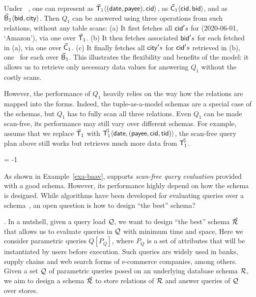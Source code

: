 \begin{example}\label{exa-baav}
Under \baav~\cite{VLDB19}, one can represent  as
$\vec{\protect\mathsf{T}}_{1}\langle (\protect\mathsf{date},\allowbreak \protect\mathsf{payee}),\allowbreak \protect\mathsf{cid}\rangle$,
 as $\vec{\protect\mathsf{C}}_{1}\langle \protect\mathsf{cid},\allowbreak \protect\mathsf{bid}\rangle$,
and  as $\vec{\protect\mathsf{B}}_{1}\langle \protect\mathsf{bid},\allowbreak \protect\mathsf{city}\rangle$.
Then $Q_{1}$ can be answered using three \get operations
from such relations, without any table scans:
(a) It first fetches all $\protect\mathsf{cid}'s$ for ({\normalsize 2020-06-01},
{\normalsize `Amazon'}), via one \get over $\vec{\protect\mathsf{T}}_{1}$.
(b) It then fetches associated $\protect\mathsf{bid}'s$ for each
 fetched in (a), via one \get over $\vec{\protect\mathsf{C}}_{1}$.
(c) It finally fetches all $\protect\mathsf{city}'s$ for $\protect\mathsf{cid}'s$
retrieved in (b), one \get~for %
each  over $\vec{\protect\mathsf{B}}_{1}$.
This illustrates the flexibility and benefits of the \baav
model: it allows us to retrieve only necessary data values for
answering $Q_{1}$ without the costly scans. %

However, the performance of $Q_{1}$ heavily relies on the way how
the relations are mapped into the \baav forms. Indeed, the
tuple-as-a-model schemas are a special case of the \baav
schemas, but $Q_{1}$ has to fully scan all three relations. Even $Q_{1}$
can be made scan-free, its performance may still vary over
different \baav schemas. For example, assume that
we replace $\vec{\protect\mathsf{T}}_{1}$
with $\vec{\protect\mathsf{T}_{1}'}\langle \protect\mathsf{date},\allowbreak (\protect\mathsf{payee},\allowbreak
  \protect\mathsf{cid},\allowbreak \protect\mathsf{tid})\rangle$, the %
scan-free query %
plan above
still works but retrieves much %
more data %
from $\vec{\protect\mathsf{T}_{1}'}$.
\end{example}
\looseness = -1

As shown in Example~\ref{exa-baav}, \baav supports {\em scan-free
query evaluation} provided with a good \baav schema.  However,
its performance highly depend on how the schema is designed.
While algorithms have been developed for
evaluating %
queries over a \baav schema~\cite{VLDB19}, an open question is
how to design ``the best'' \baav schema?

. In a nutshell, given a query load
$\mathcal Q$, we want to design ``the best'' \baav schema
$\vec{{\mathcal R}}$ that allows us to evaluate queries in $\mathcal Q$
with minimum time and space, 
Here we consider parametric \SQL 
queries $Q[P_Q]$, where $P_Q$ is a set of attributes
that will be instantiated by users before execution.
Such queries are widely used in banks, supply chains and 
web search forms of e-commerce companies, among others.
Given a
set $\mathcal Q$ of parametric \SQL queries posed on an underlying
database schema ${\mathcal R}$, we aim to design a \baav schema
$\vec{{\mathcal R}}$ to store relations of ${\mathcal R}$ and 
answer queries of $\mathcal Q$ over \kv stores.

